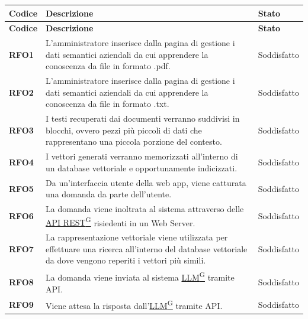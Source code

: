 \begin{longtable}{|>{\centering\arraybackslash}m{}|>{\centering\arraybackslash}m{}|>{\centering\arraybackslash}m{}|}
	\hline
	\textbf{Codice} & \textbf{Descrizione} & \textbf{Stato}\\\hline
	\endfirsthead
	\hline
	\textbf{Codice} & \textbf{Descrizione} & \textbf{Stato}\\\hline
	\endhead
	\hline
    \textbf{RFO1} & L'amministratore inserisce dalla pagina di gestione i dati semantici aziendali da cui apprendere la conoscenza da file in formato .pdf. & Soddisfatto \\
    \hline
    \textbf{RFO2} & L'amministratore inserisce dalla pagina di gestione i dati semantici aziendali da cui apprendere la conoscenza da file in formato .txt. & Soddisfatto \\
    \hline
    \textbf{RFO3} & I testi recuperati dai documenti verranno suddivisi in blocchi, ovvero pezzi più piccoli di dati che rappresentano una piccola porzione del contesto. & Soddisfatto \\
    \hline
    \textbf{RFO4} & I vettori generati verranno memorizzati all’interno di un database vettoriale e opportunamente indicizzati. & Soddisfatto \\
    \hline
    \textbf{RFO5} & Da un’interfaccia utente della web app, viene catturata una domanda da parte dell’utente. & Soddisfatto \\
    \hline
    \textbf{RFO6} & La domanda viene inoltrata al sistema attraverso delle \href{https://code7crusaders.github.io/docs/PB/documentazione_interna/glossario.html#api-rest-representational-state-transfer}{API REST\textsuperscript{G}} risiedenti in un Web Server. & Soddisfatto \\
    \hline
    \textbf{RFO7} & La rappresentazione vettoriale viene utilizzata per effettuare una ricerca all’interno del database vettoriale da dove vengono reperiti i vettori più simili. & Soddisfatto \\
    \hline
    \textbf{RFO8} & La domanda viene inviata al sistema \href{https://code7crusaders.github.io/docs/PB/documentazione_interna/glossario.html#llm-large-language-model}{LLM\textsuperscript{G}} tramite API. & Soddisfatto \\
    \hline
    \textbf{RFO9} & Viene attesa la risposta dall'\href{https://code7crusaders.github.io/docs/PB/documentazione_interna/glossario.html#llm-large-language-model}{LLM\textsuperscript{G}} tramite API. & Soddisfatto \\

\end{longtable}

